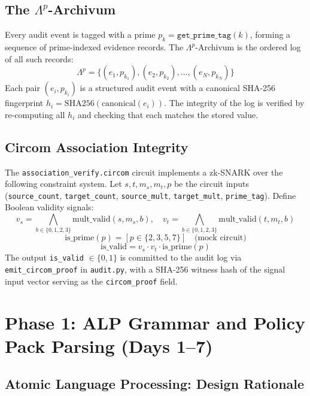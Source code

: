 \documentclass[12pt,letterpaper]{article}
\theoremstyle{definition}
\theoremstyle{remark}
\begin{document}
\subsection{The \(\Lambda^p\)-Archivum}

Every audit event is tagged with a prime \(p_k = \texttt{get\_prime\_tag}(k)\), forming
a sequence of prime-indexed evidence records. The \(\Lambda^p\)-Archivum is the ordered
log of all such records:
\[
  \Lambda^p = \{(e_1, p_{k_1}), (e_2, p_{k_2}), \ldots, (e_N, p_{k_N})\} \tag{10}
\]
Each pair \((e_i, p_{k_i})\) is a structured audit event with a canonical SHA-256
fingerprint \(h_i = \text{SHA256}(\text{canonical}(e_i))\). The integrity of the log
is verified by re-computing all \(h_i\) and checking that each matches the stored value.

\subsection{Circom Association Integrity}

The \texttt{association\_verify.circom} circuit implements a zk-SNARK over the
following constraint system. Let \(s, t, m_s, m_t, p\) be the circuit inputs
(\texttt{source\_count}, \texttt{target\_count}, \texttt{source\_mult},
\texttt{target\_mult}, \texttt{prime\_tag}). Define Boolean validity signals:
\[
  v_s = \bigwedge_{b \in \{0,1,2,3\}} \text{mult\_valid}(s, m_s, b), \quad
  v_t = \bigwedge_{b \in \{0,1,2,3\}} \text{mult\_valid}(t, m_t, b) \tag{11}
\]
\[
  \text{is\_prime}(p) = [p \in \{2, 3, 5, 7\}] \quad \text{(mock circuit)} \tag{12}
\]
\[
  \text{is\_valid} = v_s \cdot v_t \cdot \text{is\_prime}(p) \tag{13}
\]
The output \texttt{is\_valid} $\in \{0,1\}$ is committed to the audit log via
\texttt{emit\_circom\_proof} in \texttt{audit.py}, with a SHA-256 witness hash of the
signal input vector serving as the \texttt{circom\_proof} field.

\newpage

\section{Phase 1: ALP Grammar and Policy Pack Parsing (Days 1–7)}

\subsection{Atomic Language Processing: Design Rationale}
\end{document}
